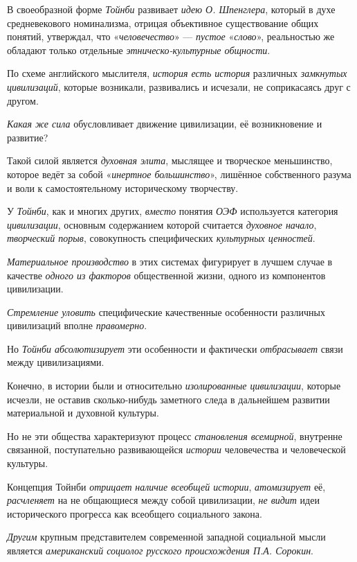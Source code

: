 \documentclass[a4paper,14pt,russian]{extreport}
\begin{document}
В своеобразной форме \emph{Тойнби} развивает \emph{идею О. Шпенглера}, который в духе средневекового номинализма, отрицая объективное существование общих понятий, утверждал, что «\emph{человечество}» --- \emph{пустое} «\emph{слово}», реальностью же обладают только отдельные \emph{этническо-культурные общности}.

По схеме английского мыслителя, \emph{история есть история} различных \emph{замкнутых цивилизаций}, которые возникали, развивались и исчезали, не соприкасаясь друг с другом.

\emph{Какая же сила} обусловливает движение цивилизации, её возникновение и развитие?

Такой силой является \emph{духовная элита}, мыслящее и творческое меньшинство, которое ведёт за собой «\emph{инертное большинство}», лишённое собственного разума и воли к самостоятельному историческому творчеству.

У \emph{Тойнби}, как и многих других, \emph{вместо} понятия \emph{ОЭФ} используется категория \emph{цивилизации}, основным содержанием которой считается \emph{духовное начало}, \emph{творческий порыв}, совокупность специфических \emph{культурных ценностей}.

\emph{Материальное производство} в этих системах фигурирует в лучшем случае в качестве \emph{одного из факторов} общественной жизни, одного из компонентов цивилизации.

\emph{Стремление уловить} специфические качественные особенности различных цивилизаций вполне \emph{правомерно}.

Но \emph{Тойнби абсолютизирует} эти особенности и фактически \emph{отбрасывает} связи между цивилизациями.

Конечно, в истории были и относительно \emph{изолированные цивилизации}, которые исчезли, не оставив сколько-нибудь заметного следа в дальнейшем развитии материальной и духовной культуры.

Но не эти общества характеризуют процесс \emph{становления всемирной}, внутренне связанной, поступательно развивающейся \emph{истории} человечества и человеческой культуры.

Концепция Тойнби \emph{отрицает} \emph{наличие всеобщей истории}, \emph{атомизирует} её, \emph{расчленяет} на не общающиеся между собой цивилизации, \emph{не видит} идеи исторического прогресса как всеобщего социального закона.

\emph{Другим} крупным представителем современной западной социальной мысли является \emph{американский социолог русского происхождения П.А. Сорокин}.
\end{document}
